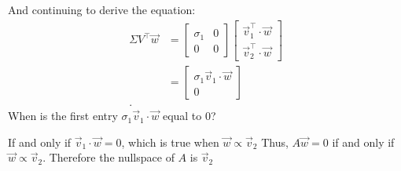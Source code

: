\documentclass[12pt]{book}
\begin{document}
And continuing to derive the equation:
 \begin{align*}
         \Sigma V^\top\vec w &= \begin{bmatrix} \sigma_1 & 0\\0&0\end{bmatrix}
         \begin{bmatrix} \vec v_1^\top \cdot \vec w\\ \vec v_2^\top\cdot \vec w \end{bmatrix}  \\
        &= \begin{bmatrix} \sigma_1 \vec v_1\cdot \vec w\\ 0 \end{bmatrix}  \\
.\end{align*}
When is the first entry $\sigma_1 \vec v_1\cdot \vec w$ equal to 0?

If and only if $\vec v_1 \cdot \vec w = 0$, which is true when $\vec w\propto \vec v_2 $
Thus, $A\vec w = 0$ if and only if  $\vec w \propto \vec v_2$. 
Therefore the nullspace of $A$ is  $\vec v_2$
\end{document}
